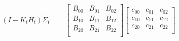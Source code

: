 \documentclass[oneside, 12pt, a4paper]{book}
\begin{document}
\begin{equation}
    \begin{split}
        (I - K_tH_t)\bar{\Sigma}_t &=
        \begin{bmatrix}
            B_{00} & B_{01} & B_{02}\\
            B_{10} & B_{11} & B_{12}\\ 
            B_{20} & B_{21} & B_{22}\\
        \end{bmatrix}
        \begin{bmatrix}
            c_{00} & c_{01} & c_{02}\\
            c_{10} & c_{11} & c_{12}\\ 
            c_{20} & c_{21} & c_{22}\\
        \end{bmatrix}
    \end{split}
\end{equation}
\end{document}
